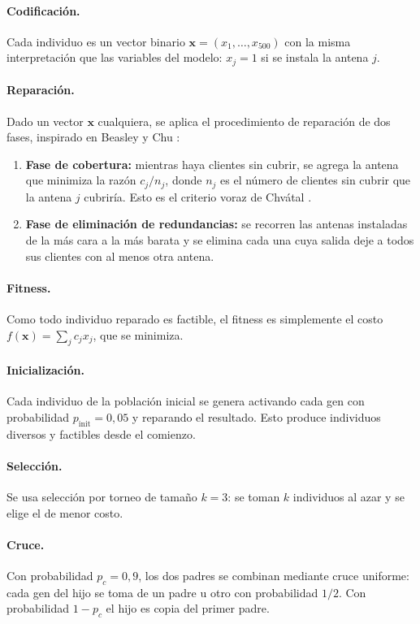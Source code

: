 \paragraph{Codificación.}
Cada individuo es un vector binario $\mathbf{x}=(x_1,\dots,x_{500})$ con la misma interpretación que las variables del modelo: $x_j=1$ si se instala la antena $j$.

\paragraph{Reparación.}
Dado un vector $\mathbf{x}$ cualquiera, se aplica el procedimiento de reparación de dos fases, inspirado en Beasley y Chu \cite{beasley96}:
\begin{enumerate}
\item \textbf{Fase de cobertura:} mientras haya clientes sin cubrir, se agrega la antena que minimiza la razón $c_j / n_j$, donde $n_j$ es el número de clientes sin cubrir que la antena $j$ cubriría. Esto es el criterio voraz de Chv\'atal \cite{chvatal79}.
\item \textbf{Fase de eliminación de redundancias:} se recorren las antenas instaladas de la más cara a la más barata y se elimina cada una cuya salida deje a todos sus clientes con al menos otra antena.
\end{enumerate}

\paragraph{Fitness.}
Como todo individuo reparado es factible, el fitness es simplemente el costo $f(\mathbf{x})=\sum_j c_jx_j$, que se minimiza.

\paragraph{Inicialización.}
Cada individuo de la población inicial se genera activando cada gen con probabilidad $p_{\text{init}}=0{,}05$ y reparando el resultado. Esto produce individuos diversos y factibles desde el comienzo.

\paragraph{Selección.}
Se usa selección por torneo de tamaño $k=3$: se toman $k$ individuos al azar y se elige el de menor costo.

\paragraph{Cruce.}
Con probabilidad $p_c=0{,}9$, los dos padres se combinan mediante cruce uniforme: cada gen del hijo se toma de un padre u otro con probabilidad $1/2$. Con probabilidad $1-p_c$ el hijo es copia del primer padre.

